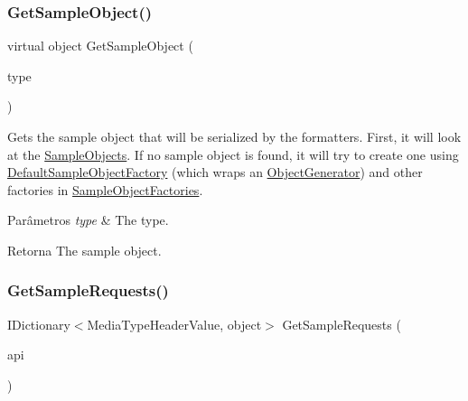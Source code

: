 \subsubsection{\texorpdfstring{Get\+Sample\+Object()}{GetSampleObject()}}
{\footnotesize\ttfamily virtual object Get\+Sample\+Object (\begin{DoxyParamCaption}\item[{Type}]{type }\end{DoxyParamCaption})\hspace{0.3cm}{\ttfamily [virtual]}}



Gets the sample object that will be serialized by the formatters. First, it will look at the \hyperlink{classApi3Layers_1_1Areas_1_1HelpPage_1_1HelpPageSampleGenerator_a74c69a35009188bdaff61af066b34aaa}{Sample\+Objects}. If no sample object is found, it will try to create one using \hyperlink{classApi3Layers_1_1Areas_1_1HelpPage_1_1HelpPageSampleGenerator_ad705006e59bbf735bcf96abbf25219f2}{Default\+Sample\+Object\+Factory} (which wraps an \hyperlink{classApi3Layers_1_1Areas_1_1HelpPage_1_1ObjectGenerator}{Object\+Generator}) and other factories in \hyperlink{classApi3Layers_1_1Areas_1_1HelpPage_1_1HelpPageSampleGenerator_afe79b8cfae9329d64220589984337741}{Sample\+Object\+Factories}. 


\begin{DoxyParams}{Parâmetros}
{\em type} & The type.\\
\hline
\end{DoxyParams}
\begin{DoxyReturn}{Retorna}
The sample object.
\end{DoxyReturn}
\mbox{\label{classApi3Layers_1_1Areas_1_1HelpPage_1_1HelpPageSampleGenerator_a8390b1d96ceaaccb4ee4540b971f51d0}} 
\subsubsection{\texorpdfstring{Get\+Sample\+Requests()}{GetSampleRequests()}}
{\footnotesize\ttfamily I\+Dictionary$<$Media\+Type\+Header\+Value, object$>$ Get\+Sample\+Requests (\begin{DoxyParamCaption}\item[{Api\+Description}]{api }\end{DoxyParamCaption})}




